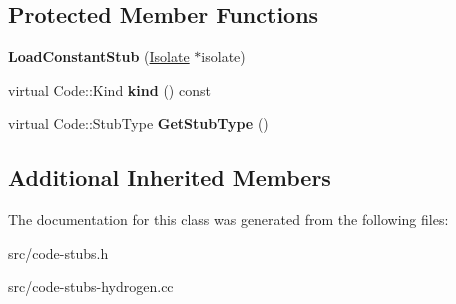 \subsection*{Protected Member Functions}
\begin{DoxyCompactItemize}
\item 
\hypertarget{classv8_1_1internal_1_1_load_constant_stub_a65ae37f347b74997d595198f46f93dff}{}{\bfseries Load\+Constant\+Stub} (\hyperlink{classv8_1_1internal_1_1_isolate}{Isolate} $\ast$isolate)\label{classv8_1_1internal_1_1_load_constant_stub_a65ae37f347b74997d595198f46f93dff}

\item 
\hypertarget{classv8_1_1internal_1_1_load_constant_stub_ae83be9911807004cd7be8cea2f031488}{}virtual Code\+::\+Kind {\bfseries kind} () const \label{classv8_1_1internal_1_1_load_constant_stub_ae83be9911807004cd7be8cea2f031488}

\item 
\hypertarget{classv8_1_1internal_1_1_load_constant_stub_a429097eb8d88f62a2d5fc5b1a64beebb}{}virtual Code\+::\+Stub\+Type {\bfseries Get\+Stub\+Type} ()\label{classv8_1_1internal_1_1_load_constant_stub_a429097eb8d88f62a2d5fc5b1a64beebb}

\end{DoxyCompactItemize}
\subsection*{Additional Inherited Members}


The documentation for this class was generated from the following files\+:\begin{DoxyCompactItemize}
\item 
src/code-\/stubs.\+h\item 
src/code-\/stubs-\/hydrogen.\+cc\end{DoxyCompactItemize}
